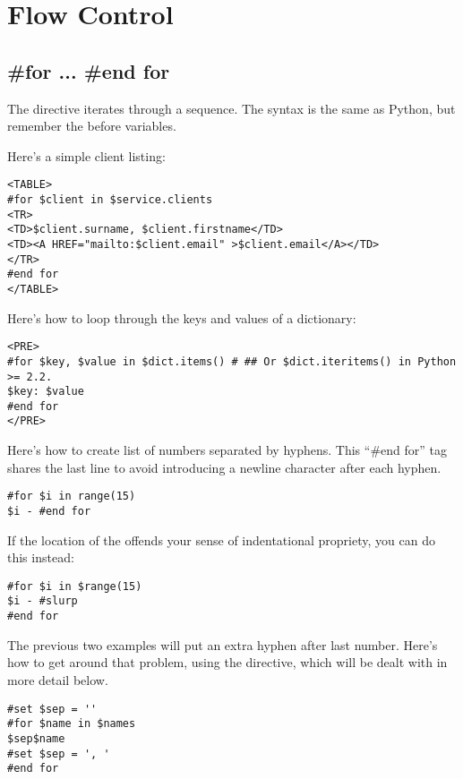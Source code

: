 \section{Flow Control}
\label{flowControl}


\subsection{\#for ... \#end for}
\label{flowControl.for}

The  directive iterates through a sequence.  The syntax is the same
as Python,  but remember the \code{\$} before variables.

Here's a simple client listing:
\begin{verbatim}
<TABLE>
#for $client in $service.clients
<TR>
<TD>$client.surname, $client.firstname</TD>
<TD><A HREF="mailto:$client.email" >$client.email</A></TD>
</TR>
#end for
</TABLE>
\end{verbatim}

Here's how to loop through the  keys and values of a dictionary:
\begin{verbatim}
<PRE>
#for $key, $value in $dict.items() # ## Or $dict.iteritems() in Python >= 2.2.
$key: $value
#end for
</PRE>
\end{verbatim}

Here's how to create list of numbers separated by hyphens. This ``\#end for''
tag shares the last line to avoid introducing a newline character after each
hyphen.  
\begin{verbatim}
#for $i in range(15)
$i - #end for
\end{verbatim}

If the location of the  offends your sense of indentational
propriety, you can do this instead:
\begin{verbatim}
#for $i in $range(15)
$i - #slurp
#end for
\end{verbatim}

The previous two examples will put an extra hyphen after last number.  Here's
how to get around that problem, using the  directive, which will be
dealt with in more detail below.
\begin{verbatim}
#set $sep = '' 
#for $name in $names 
$sep$name 
#set $sep = ', ' 
#end for 
\end{verbatim}

